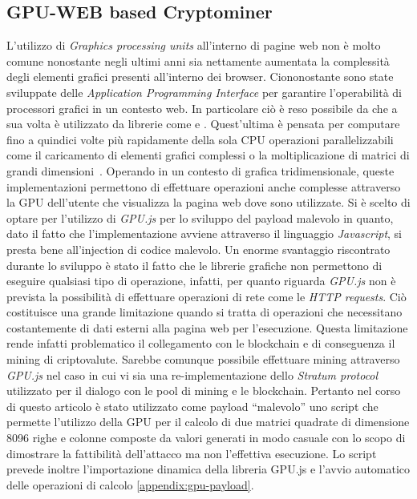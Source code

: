 \documentclass[conference, italian]{IEEEtran}
\begin{document}
\subsection{GPU-WEB based Cryptominer}\label{sec:gpu-web-based-cryptominer}
L'utilizzo di \emph{Graphics processing units} all'interno di pagine web non è molto comune nonostante negli ultimi anni sia nettamente aumentata la complessità degli elementi grafici presenti all'interno dei browser. Ciononostante sono state sviluppate delle \emph{Application Programming Interface} per garantire l'operabilità di processori grafici in un contesto web. In particolare ciò è reso possibile da  che a sua volta è utilizzato da librerie come  e . Quest'ultima è pensata per computare fino a quindici volte più rapidamente della sola CPU operazioni parallelizzabili come il caricamento di elementi grafici complessi o la moltiplicazione di matrici di grandi dimensioni~\citep{banchmarkGPU.js}. Operando in un contesto di grafica tridimensionale, queste implementazioni permettono di effettuare operazioni anche complesse attraverso la GPU dell'utente che visualizza la pagina web dove sono utilizzate. Si è scelto di optare per l'utilizzo di \emph{GPU.js} per lo sviluppo del payload malevolo in quanto, dato il fatto che l'implementazione avviene attraverso il linguaggio \emph{Javascript}, si presta bene all'injection di codice malevolo. Un enorme svantaggio riscontrato durante lo sviluppo è stato il fatto che le librerie grafiche non permettono di eseguire qualsiasi tipo di operazione, infatti, per quanto riguarda \emph{GPU.js} non è prevista la possibilità di effettuare operazioni di rete come le \emph{HTTP requests}. Ciò costituisce una grande limitazione quando si tratta di operazioni che necessitano costantemente di dati esterni alla pagina web per l'esecuzione. Questa limitazione rende infatti problematico il collegamento con le blockchain e di conseguenza il mining di criptovalute. Sarebbe comunque possibile effettuare mining attraverso \emph{GPU.js} nel caso in cui vi sia una re-implementazione dello \emph{Stratum protocol} \cite{recabarren2017hardening} utilizzato per il dialogo con le pool di mining e le blockchain. Pertanto nel corso di questo articolo è stato utilizzato come payload ``malevolo'' uno script che permette l'utilizzo della GPU per il calcolo di due matrici quadrate di dimensione 8096 righe e colonne composte da valori generati in modo casuale con lo scopo di dimostrare la fattibilità dell'attacco ma non l'effettiva esecuzione. Lo script prevede inoltre l'importazione dinamica della libreria GPU.js e l'avvio automatico delle operazioni di calcolo \cref{appendix:gpu-payload}.
\end{document}
